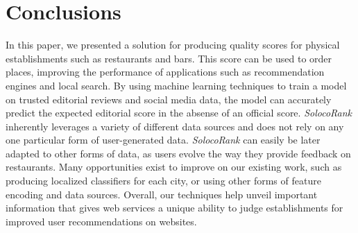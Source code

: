 \section{Conclusions}
\label{sec:conclusion}

In this paper, we presented a solution for 
producing quality scores for physical establishments such as 
restaurants and bars.
This score can be used to order places, improving the performance
of applications such as recommendation engines and local search.
By using machine learning techniques to train a model on trusted
editorial reviews and social media data,
the model can accurately predict the expected editorial score
in the absense of an official score.
\emph{SolocoRank} inherently leverages a variety of different data sources
and does not rely on any one particular form of user-generated data.
\emph{SolocoRank} can easily be later adapted to other forms of data,
as users evolve the way they provide feedback on restaurants.
Many opportunities exist to improve on our existing work,
such as producing localized classifiers for each city,
or using other forms of feature encoding and data sources.
Overall, our techniques help unveil important information
that gives web services a unique ability to judge establishments
for improved user recommendations on websites.
